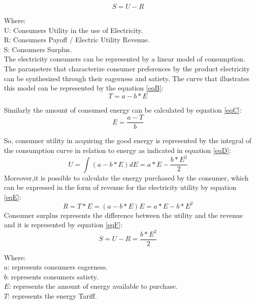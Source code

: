 \documentclass[10pt, letterpaper]{elsarticle}
\begin{document}
\begin{equation}
\label{eqA}
S = U - R
\end{equation}

Where:\\

U: Consumers Utility in the use of Electricity.\\
R: Consumers Payoff / Electric Utility Revenue.\\
S: Consumers Surplus.\\

The electricity consumers can be represented by a linear model of consumption. The parameters that characterize consumer preferences by the product electricity can be synthesized through their eagerness and satiety. The curve that illustrates this model can be represented by the equation \ref{eqB}:\\
\begin{equation}
T = a - b*E
\label{eqB}
\end{equation}

Similarly the amount of consumed energy can be calculated by equation \ref{eqC}:\\
\begin{equation}
E = \frac{a-T}{b}
\label{eqC}
\end{equation}

So, consumer utility in acquiring the good energy is represented by the integral of the consumption curve in relation to energy as indicated in equation \ref{eqD}:\\
\begin{equation}
U=\int(a-b*E)dE= a*E-\frac{b*E^2}{2}
\label{eqD}
\end{equation}
Moreover,it is possible to calculate the energy purchased by the consumer, which can be expressed in the form of revenue for the electricity utility by equation \ref{eqE}:\\
\begin{equation}
R= T*E = (a-b*E)E = a*E - b*E^2
\label{eqE}
\end{equation}
Consumer surplus represents the difference between the utility and the revenue and it is represented by equation \ref{eqF}:\\
 \begin{equation}
S = U-R = \frac{b*E^2}{2}
 \label{eqF}
 \end{equation}
 
Where:\\

$a$: represents consumers eagerness.\\
$b$: represents consumers satiety.\\
$E$: represents the amount of energy available to purchase.\\
$T$: represents the energy Tariff.\\ 
\end{document}
